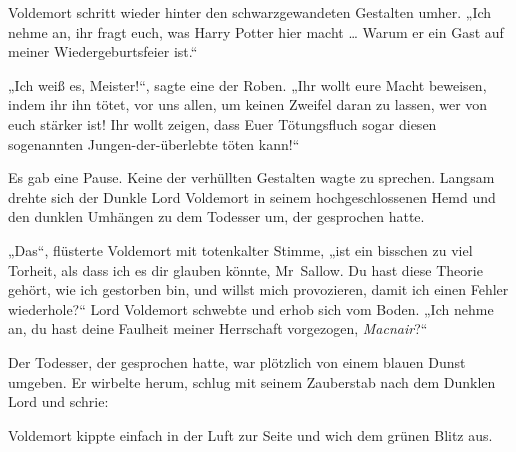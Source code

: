 Voldemort schritt wieder hinter den schwarzgewandeten Gestalten umher.
„Ich nehme an, ihr fragt euch, was Harry Potter hier macht … Warum er ein Gast auf meiner Wiedergeburtsfeier ist.“

„Ich weiß es, Meister!“, sagte eine der Roben.
„Ihr wollt eure Macht beweisen, indem ihr ihn tötet, vor uns allen, um keinen Zweifel daran zu lassen, wer von euch stärker ist! Ihr wollt zeigen, dass Euer Tötungsfluch sogar diesen sogenannten Jungen-der-überlebte töten kann!“

Es gab eine Pause. Keine der verhüllten Gestalten wagte zu sprechen.
Langsam drehte sich der Dunkle Lord Voldemort in seinem hochgeschlossenen Hemd und den dunklen Umhängen zu dem Todesser um, der gesprochen hatte.

„Das“, flüsterte Voldemort mit totenkalter Stimme, „ist ein bisschen zu viel Torheit, als dass ich es dir glauben könnte, Mr~Sallow. Du hast diese Theorie gehört, wie ich gestorben bin, und willst mich provozieren, damit ich einen Fehler wiederhole?“
Lord Voldemort schwebte und erhob sich vom Boden.
„Ich nehme an, du hast deine Faulheit meiner Herrschaft vorgezogen, \emph{Macnair}?“

Der Todesser, der gesprochen hatte, war plötzlich von einem blauen Dunst umgeben. Er wirbelte herum, schlug mit seinem Zauberstab nach dem Dunklen Lord und schrie: 

Voldemort kippte einfach in der Luft zur Seite und wich dem grünen Blitz aus.


